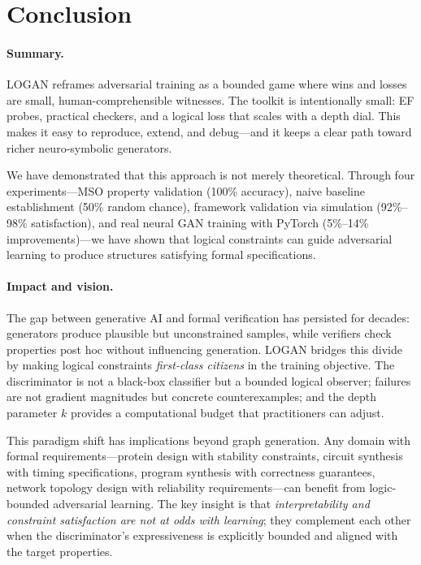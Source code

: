 \documentclass{article}
\begin{document}
\section{Conclusion}

\paragraph{Summary.}
LOGAN reframes adversarial training as a bounded game where wins and losses are small, human-comprehensible witnesses. The toolkit is intentionally small: EF probes, practical checkers, and a logical loss that scales with a depth dial. This makes it easy to reproduce, extend, and debug---and it keeps a clear path toward richer neuro-symbolic generators.

We have demonstrated that this approach is not merely theoretical. Through four experiments---MSO property validation (100\% accuracy), naive baseline establishment (50\% random chance), framework validation via simulation (92\%--98\% satisfaction), and real neural GAN training with PyTorch (5\%--14\% improvements)---we have shown that logical constraints can guide adversarial learning to produce structures satisfying formal specifications.

\paragraph{Impact and vision.}
The gap between generative AI and formal verification has persisted for decades: generators produce plausible but unconstrained samples, while verifiers check properties post hoc without influencing generation. LOGAN bridges this divide by making logical constraints \emph{first-class citizens} in the training objective. The discriminator is not a black-box classifier but a bounded logical observer; failures are not gradient magnitudes but concrete counterexamples; and the depth parameter $k$ provides a computational budget that practitioners can adjust.

This paradigm shift has implications beyond graph generation. Any domain with formal requirements---protein design with stability constraints, circuit synthesis with timing specifications, program synthesis with correctness guarantees, network topology design with reliability requirements---can benefit from logic-bounded adversarial learning. The key insight is that \emph{interpretability and constraint satisfaction are not at odds with learning}; they complement each other when the discriminator's expressiveness is explicitly bounded and aligned with the target properties.
\end{document}
